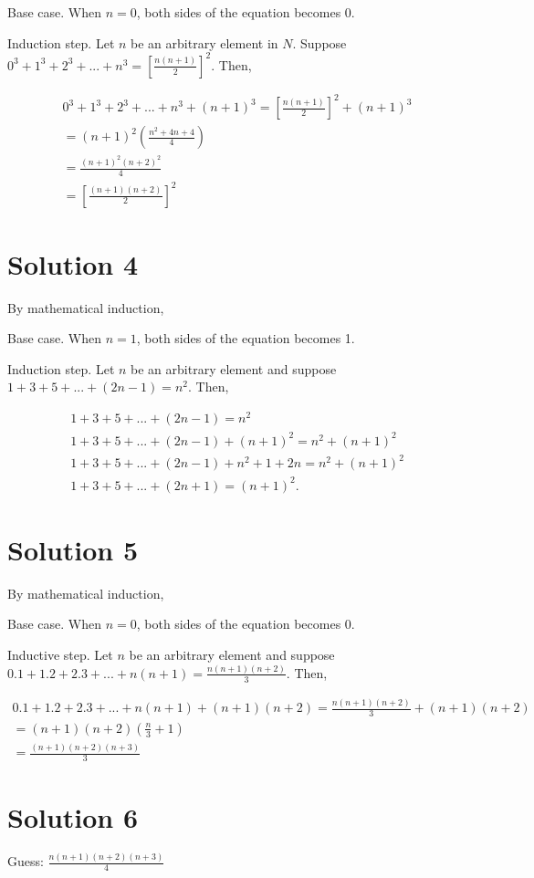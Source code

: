 \documentclass{article}
\begin{document}
Base case. When $n=0$, both sides of the equation becomes $0$.

Induction step. Let $n$ be an arbitrary element in $N$. Suppose $0^3 +
1^3 + 2^3 + ... + n^3 = [\frac{n(n+1)}{2}]^2$. Then,

\begin{align*}
  0^3 + 1^3 + 2^3 + ... + n^3 + (n+1)^3= [\frac{n(n+1)}{2}]^2 + (n+1)^3 \\
  = (n+1)^2(\frac{n^2 + 4n + 4}{4}) \\
  = \frac{(n+1)^2(n+2)^2}{4} \\
  = [\frac{(n+1)(n+2)}{2}]^2 
\end{align*}

\section{Solution 4}
By mathematical induction,

Base case. When $n=1$, both sides of the equation becomes 1.

Induction step. Let $n$ be an arbitrary element and suppose $1+3+5+...
+ (2n-1) = n^2$. Then,

\begin{align*}
  1 + 3 + 5 + ... + (2n - 1) = n^2 \\
  1 + 3 + 5 + ... + (2n - 1) + (n+1)^2 = n^2 + (n+1)^2 \\
  1 + 3 + 5 + ... + (2n - 1) + n^2 + 1 + 2n = n^2 + (n+1)^2 \\
  1 + 3 + 5 + ... + (2n + 1) = (n+1)^2.
\end{align*}

\section{Solution 5}
By mathematical induction,

Base case. When $n=0$, both sides of the equation becomes $0$.

Inductive step. Let $n$ be an arbitrary element and suppose $0.1 + 1.2
+ 2.3 + ... + n(n+1) = \frac{n(n+1)(n+2)}{3}$. Then,

\begin{align*}
  0.1 + 1.2 + 2.3 + ... + n(n+1) + (n+1)(n+2) = \frac{n(n+1)(n+2)}{3}
  + (n+1)(n+2) \\
  = (n+1)(n+2)(\frac{n}{3} + 1) \\
  = \frac{(n+1)(n+2)(n+3)}{3}
\end{align*}
\section{Solution 6}
Guess: $\frac{n(n+1)(n+2)(n+3)}{4}$
\end{document}
